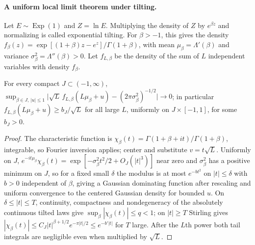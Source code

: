\documentclass[anon]{alt2027}
\newcommand{\Exp}{\operatorname{Exp}}
\begin{document}
\paragraph{A uniform local limit theorem under tilting.}
Let $E\sim\Exp(1)$ and $Z=\ln E$. Multiplying the density of $Z$ by $e^{\beta z}$ and normalizing is called exponential tilting. For $\beta>-1$, this gives the density $f_\beta(z)=\exp[(1+\beta)z-e^z]/\Gamma(1+\beta)$, with mean $\mu_\beta=\Lambda'(\beta)$ and variance $\sigma_\beta^2=\Lambda''(\beta)>0$. Let $f_{L,\beta}$ be the density of the sum of $L$ independent variables with density $f_\beta$.
\begin{lemma}
\label{lem:lclt}
For every compact $J\subset(-1,\infty)$, $\sup_{\beta\in J,\,|u|\le1}\bigl|\sqrt L\,f_{L,\beta}(L\mu_\beta+u)-(2\pi\sigma_\beta^2)^{-1/2}\bigr|\to0$; in particular $f_{L,\beta}(L\mu_\beta+u)\ge b_J/\sqrt L$ for all large $L$, uniformly on $J\times[-1,1]$, for some $b_J>0$.
\end{lemma}
\begin{proof}
The characteristic function is $\chi_\beta(t)=\Gamma(1+\beta+it)/\Gamma(1+\beta)$, integrable, so Fourier inversion applies; center and substitute $v=t\sqrt L$. Uniformly on $J$, $e^{-it\mu_\beta}\chi_\beta(t)=\exp[-\sigma_\beta^2t^2/2+O_J(|t|^3)]$ near zero and $\sigma_\beta^2$ has a positive minimum on $J$, so for a fixed small $\delta$ the modulus is at most $e^{-bt^2}$ on $|t|\le\delta$ with $b>0$ independent of $\beta$, giving a Gaussian dominating function after rescaling and uniform convergence to the centered Gaussian density for bounded $u$. On $\delta\le|t|\le T$, continuity, compactness and nondegeneracy of the absolutely continuous tilted laws give $\sup_\beta|\chi_\beta(t)|\le q<1$; on $|t|\ge T$ Stirling gives $|\chi_\beta(t)|\le C_J|t|^{\beta+1/2}e^{-\pi|t|/2}\le e^{-b'|t|}$ for $T$ large. After the $L$th power both tail integrals are negligible even when multiplied by $\sqrt L$.
\end{proof}
\end{document}
